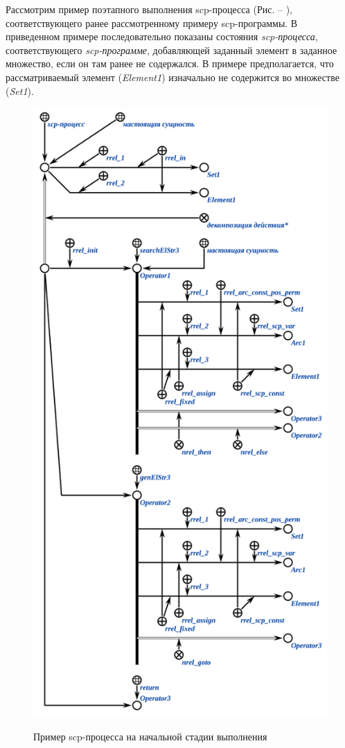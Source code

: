 Рассмотрим пример поэтапного выполнения scp-процесса (Рис. \textit{} -- \textit{}), соответствующего ранее рассмотренному примеру scp-программы. В приведенном примере последовательно показаны состояния \textit{scp-процесса}, соответствующего \textit{\mbox{scp-программе}}, добавляющей заданный элемент в заданное множество, если он там ранее не содержался. В примере предполагается, что рассматриваемый элемент (\textit{Element1}) изначально не содержится во множестве (\textit{Set1}).

\begin{figure}[H]
	\centering
	\caption{Пример scp-процесса на начальной стадии выполнения}
	\includegraphics[scale=0.8]{images/part3/chapter_situation_management/process_example.png}
	\label{fig:process_example}
\end{figure}

